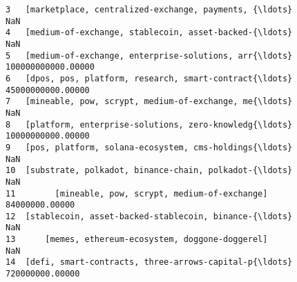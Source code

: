 \documentclass[11pt]{article}
\begin{document}
\begin{tcolorbox}[breakable, size=fbox, boxrule=.5pt, pad at break*=1mm, opacityfill=0]
\begin{Verbatim}[commandchars=\\\{\}]
3   [marketplace, centralized-exchange, payments, {\ldots}                NaN
4   [medium-of-exchange, stablecoin, asset-backed-{\ldots}                NaN
5   [medium-of-exchange, enterprise-solutions, arr{\ldots} 100000000000.00000
6   [dpos, pos, platform, research, smart-contract{\ldots}  45000000000.00000
7   [mineable, pow, scrypt, medium-of-exchange, me{\ldots}                NaN
8   [platform, enterprise-solutions, zero-knowledg{\ldots}  10000000000.00000
9   [pos, platform, solana-ecosystem, cms-holdings{\ldots}                NaN
10  [substrate, polkadot, binance-chain, polkadot-{\ldots}                NaN
11        [mineable, pow, scrypt, medium-of-exchange]     84000000.00000
12  [stablecoin, asset-backed-stablecoin, binance-{\ldots}                NaN
13      [memes, ethereum-ecosystem, doggone-doggerel]                NaN
14  [defi, smart-contracts, three-arrows-capital-p{\ldots}    720000000.00000


\end{Verbatim}
\end{tcolorbox}
\end{document}
